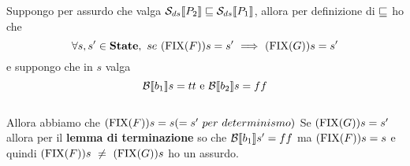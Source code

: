 {    Suppongo per assurdo che valga $\mathcal{S}_{ds}\llbracket P_2 \rrbracket  \sqsubseteq \mathcal{S}_{ds}\llbracket P_1 \rrbracket$, allora
    per definizione di $\sqsubseteq$ ho che 
    \[
    \forall{}s,s'\in\mbox{\textbf{State}},~se~(\textrm{\normalfont{FIX}}(F))s=s'~\Longrightarrow~(\textrm{\normalfont{FIX}}(G))s=s'
    \]
    e suppongo che in $s$ valga 
    \[ \evalBbs{b_1}{s}=tt $ e $ \evalBbs{b_2}{s}=ff \]
    \\Allora abbiamo che $(\textrm{\normalfont{FIX}}(F))s=s(=s'~per~determinismo)$
    Se $(\textrm{\normalfont{FIX}}(G))s=s'$ allora per il \textbf{lemma di terminazione} so che
    $\mathcal{B}{}\llbracket b_1 \rrbracket{} s'=ff$ ma $(\textrm{\normalfont{FIX}}(F))s=s$ e quindi 
    $(\textrm{\normalfont{FIX}}(F))s~\neq~(\textrm{\normalfont{FIX}}(G))s$ ho un assurdo.
}
\newpage